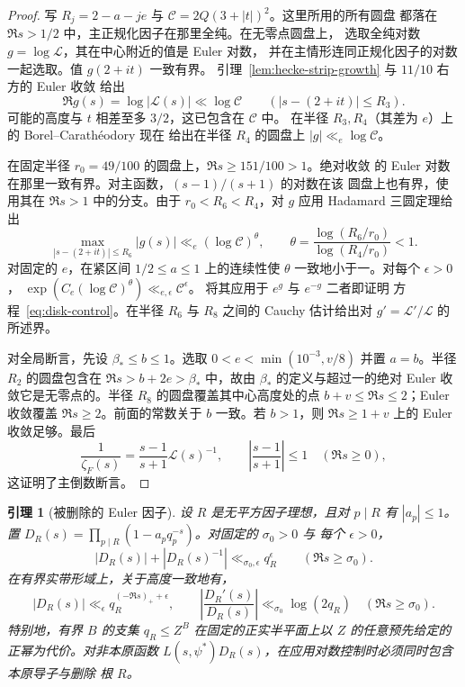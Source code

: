 \documentclass[11pt,a4paper]{article}
\numberwithin{equation}{section}
\numberwithin{figure}{section}
\newtheorem{lemma}[theorem]{引理}
\theoremstyle{definition}
\theoremstyle{remark}
\begin{document}
\begin{proof}
写 $R_j=2-a-je$ 与 $\mathcal C=2Q(3+|t|)^2$。这里所用的所有圆盘
都落在 $\Re s>1/2$ 中，主正规化因子在那里全纯。在无零点圆盘上，
选取全纯对数 $g=\log\mathcal L$，其在中心附近的值是 Euler 对数，
并在主情形连同正规化因子的对数一起选取。值 $g(2+it)$ 一致有界。
引理~\ref{lem:hecke-strip-growth} 与 $11/10$ 右方的 Euler 收敛
给出
\[
 \Re g(s)=\log|\mathcal L(s)|\ll\log\mathcal C
       \qquad(|s-(2+it)|\le R_3).
\]
可能的高度与 $t$ 相差至多 $3/2$，这已包含在 $\mathcal C$ 中。
在半径 $R_3,R_4$（其差为 $e$）上的 Borel--Carath\'eodory 现在
给出在半径 $R_4$ 的圆盘上 $|g|\ll_e\log\mathcal C$。

在固定半径 $r_0=49/100$ 的圆盘上，$\Re s\ge151/100>1$。绝对收敛
的 Euler 对数在那里一致有界。对主函数，$(s-1)/(s+1)$ 的对数在该
圆盘上也有界，使用其在 $\Re s>1$ 中的分支。由于
$r_0<R_6<R_4$，对 $g$ 应用 Hadamard 三圆定理给出
\[
 \max_{|s-(2+it)|\le R_6}|g(s)|
 \ll_e(\log\mathcal C)^\theta,
 \qquad
 \theta=\frac{\log(R_6/r_0)}{\log(R_4/r_0)}<1.
\]
对固定的 $e$，在紧区间 $1/2\le a\le1$ 上的连续性使 $\theta$
一致地小于一。对每个 $\epsilon>0$，
$\exp(C_e(\log\mathcal C)^\theta)\ll_{e,\epsilon}\mathcal C^\epsilon$。
将其应用于 $e^g$ 与 $e^{-g}$ 二者即证明
方程~\eqref{eq:disk-control}。在半径 $R_6$ 与 $R_8$ 之间的 Cauchy
估计给出对 $g'=\mathcal L'/\mathcal L$ 的所述界。

对全局断言，先设 $\beta_*\le b\le1$。选取
$0<e<\min(10^{-3},v/8)$ 并置 $a=b$。半径 $R_2$ 的圆盘包含在
$\Re s>b+2e>\beta_*$ 中，故由 $\beta_*$ 的定义与超过一的绝对
Euler 收敛它是无零点的。半径 $R_8$ 的圆盘覆盖其中心高度处的点
$b+v\le\Re s\le2$；Euler 收敛覆盖 $\Re s\ge2$。前面的常数关于
$b$ 一致。若 $b>1$，则 $\Re s\ge1+v$ 上的 Euler 收敛足够。最后
\[
 \frac1{\zeta_F(s)}=\frac{s-1}{s+1}\mathcal L(s)^{-1},
 \qquad \left|\frac{s-1}{s+1}\right|\le1\quad(\Re s\ge0),
\]
这证明了主倒数断言。
\end{proof}

\begin{lemma}[被删除的 Euler 因子]\label{lem:deleted-euler-factors}
设 $R$ 是无平方因子理想，且对 $p\mid R$ 有 $|a_p|\le1$。置
$D_R(s)=\prod_{p\mid R}(1-a_pq_p^{-s})$。对固定的 $\sigma_0>0$ 与
每个 $\epsilon>0$，
\[
 |D_R(s)|+|D_R(s)^{-1}|\ll_{\sigma_0,\epsilon}q_R^\epsilon
       \qquad(\Re s\ge\sigma_0).
\]
在有界实带形域上，关于高度一致地有，
\[
 |D_R(s)|\ll_\epsilon q_R^{(-\Re s)_++\epsilon},
 \qquad
 \left|\frac{D_R'(s)}{D_R(s)}\right|
 \ll_{\sigma_0}\log(2q_R)\quad(\Re s\ge\sigma_0).
\]
特别地，有界 $B$ 的支集 $q_R\le Z^B$ 在固定的正实半平面上以 $Z$
的任意预先给定的正幂为代价。对非本原函数
$L(s,\psi^*)D_R(s)$，在应用对数控制时必须同时包含本原导子与删除
根 $R$。
\end{lemma}
\end{document}
